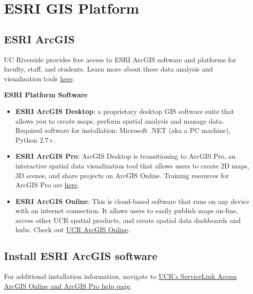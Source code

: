 \documentclass[
]{book}
\providecommand{\tightlist}{%
  \setlength{\itemsep}{0pt}\setlength{\parskip}{0pt}}
\begin{document}
\hypertarget{esri}{%
\chapter{ESRI GIS Platform}\label{esri}}

\hypertarget{esri-arcgis}{%
\section{ESRI ArcGIS}\label{esri-arcgis}}

UC Riverside provides free access to ESRI ArcGIS software and platforms for faculty, staff, and students. Learn more about these data analysis and visualization tools \href{https://ucrsupport.service-now.com/ucr_portal?id=sc_category\&sys_id=e9b36a7e1b691c10eab58734ec4bcb78\&catalog_id=-1}{here}.

\textbf{ESRI Platform Software}

\begin{itemize}
\tightlist
\item
  \textbf{ESRI ArcGIS Desktop}: a proprietary desktop GIS software suite that allows you to create maps, perform spatial analysis and manage data. Required software for installation: Microsoft .NET (aka a PC machine), Python 2.7+.
\item
  \textbf{ESRI ArcGIS Pro}: ArcGIS Desktop is transitioning to ArcGIS Pro, an interactive spatial data visualization tool that allows users to create 2D maps, 3D scenes, and share projects on ArcGIS Online. Training resources for ArcGIS Pro are \href{https://www.esri.com/en-us/arcgis/products/arcgis-pro/resources}{here}.
\item
  \textbf{ESRI ArcGIS Online}: This is cloud-based software that runs on any device with an internet connection. It allows users to easily publish maps on-line, access other UCR spatial products, and create spatial data dashboards and hubs. Check out \href{https://ucr.maps.arcgis.com/home/index.html}{UCR ArcGIS Online}.
\end{itemize}

\hypertarget{install-esri-arcgis-software}{%
\section{Install ESRI ArcGIS software}\label{install-esri-arcgis-software}}

For additional installation information, navigate to \href{https://ucrsupport.service-now.com/ucr_portal?id=kb_article\&sys_id=0231b6e21b095190453e7592cd4bcbaf}{UCR's ServiceLink Access ArcGIS Online and ArcGIS Pro help page}.
\end{document}
